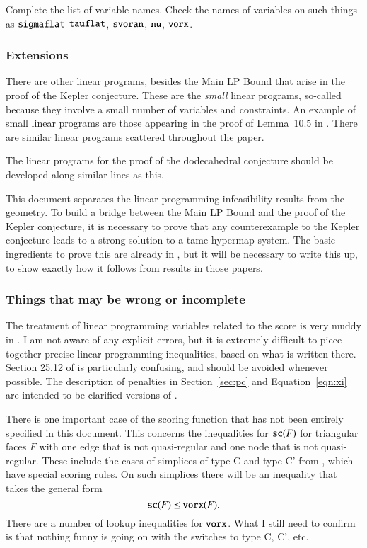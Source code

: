 Complete the list of variable names.  Check the names of variables
on such things as ${\operatorname{{\texttt{sigmaflat}}}}$ ${\operatorname{{\texttt{tauflat}}}}$,
${\operatorname{{\texttt{svoran}}}}$, ${\operatorname{{\texttt{nu}}}}$, ${\operatorname{{\texttt{vorx}}}}$.

\subsubsection{Extensions}

There are other linear programs, besides the Main LP Bound that
arise in the proof of the Kepler conjecture.  These are the {\it
small} linear programs, so-called because they involve a small
number of variables and constraints.  An example of small linear
programs are those appearing in the proof of Lemma~10.5 in
\cite{DCG}.  There are similar linear programs scattered
throughout the paper.

The linear programs for the proof of the dodecahedral conjecture
should be developed along similar lines as this.

This document separates the linear programming infeasibility
results from the geometry.  To build a bridge between the Main LP
Bound and the proof of the Kepler conjecture, it is necessary to
prove that any counterexample to the Kepler conjecture leads to a
strong solution to a tame hypermap system.  The basic ingredients
to prove this are already in \cite{DCG}, but it will be necessary
to write this up, to show exactly how it follows from results in
those papers.




\subsubsection{Things that may be wrong or incomplete}
\label{sec:wrong}

The treatment of linear programming variables related to the score
is very muddy in \cite{DCG}.   I am not aware of any explicit
errors, but it is extremely difficult to piece together precise
linear programming inequalities, based on what is written there.
Section 25.12 of \cite{DCG} is particularly confusing, and should
be avoided whenever possible.  The description of penalties in
Section~\ref{sec:pc} and Equation~\ref{eqn:xi} are intended to be
clarified versions of \cite{DCG}.

There is one important case of the scoring function that has not
been entirely specified in this document.  This concerns the
inequalities for ${\operatorname{{\texttt{sc}}}}(F)$ for triangular faces $F$ with one
edge that is not quasi-regular and one node that is not
quasi-regular.  These include the cases of simplices of type C and
type C' from \cite[Sec.9.4,pp.94--99]{DCG}, which have special
scoring rules.  On such simplices there will be an inequality that
takes the general form
    $$
    {\operatorname{{\texttt{sc}}}}(F)\preceq {\operatorname{{\texttt{vorx}}}}(F).
    $$
There are a number of lookup inequalities for ${\operatorname{{\texttt{vorx}}}}$.  What
I still need to confirm is that nothing funny is going on with the
switches to type C, C', etc.

